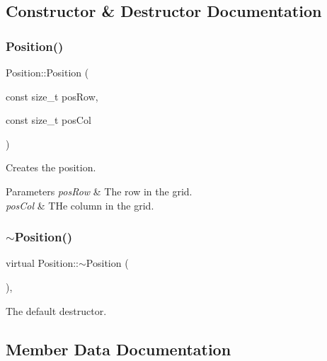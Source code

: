 \subsection{Constructor \& Destructor Documentation}
\mbox{\label{struct_position_a5b1c9b0f98d4ba290679fcd06284a0c8}} 
\subsubsection{\texorpdfstring{Position()}{Position()}}
{\footnotesize\ttfamily Position\+::\+Position (\begin{DoxyParamCaption}\item[{const size\+\_\+t}]{pos\+Row,  }\item[{const size\+\_\+t}]{pos\+Col }\end{DoxyParamCaption})\hspace{0.3cm}{\ttfamily [inline]}}



Creates the position. 


\begin{DoxyParams}{Parameters}
{\em pos\+Row} & The row in the grid. \\
\hline
{\em pos\+Col} & T\+He column in the grid. \\
\hline
\end{DoxyParams}
\mbox{\label{struct_position_aa8917a1643d950d09a44957956aed67a}} 
\subsubsection{\texorpdfstring{$\sim$Position()}{~Position()}}
{\footnotesize\ttfamily virtual Position\+::$\sim$\+Position (\begin{DoxyParamCaption}{ }\end{DoxyParamCaption})\hspace{0.3cm}{\ttfamily [virtual]}, {\ttfamily [default]}}



The default destructor. 



\subsection{Member Data Documentation}
\mbox{\label{struct_position_abac43d1772ad2cf9447b134240e88d27}} 

